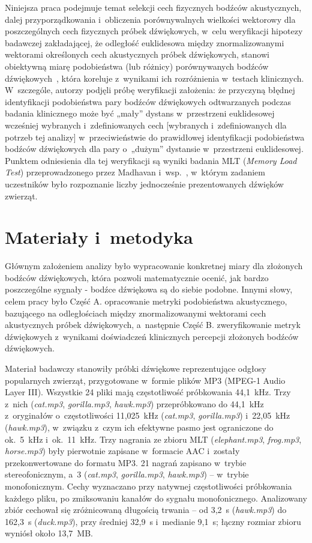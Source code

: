 \documentclass{article}
\begin{document}
Niniejsza praca podejmuje temat selekcji cech fizycznych bodźców akustycznych, dalej przyporządkowania i~obliczenia porównywalnych wielkości wektorowy dla poszczególnych cech fizycznych próbek dźwiękowych, w~celu weryfikacji hipotezy badawczej zakładającej, że odległość euklidesowa między znormalizowanymi wektorami określonych cech akustycznych próbek dźwiękowych, stanowi obiektywną miarę podobieństwa (lub różnicy) porównywanych bodźców dźwiękowych~\cite{MadhavanWrobel2024MLT}, która koreluje z~wynikami ich rozróżnienia w~testach klinicznych. W~szczególe, autorzy podjęli próbę weryfikacji założenia: że przyczyną błędnej identyfikacji podobieństwa pary bodźców dźwiękowych odtwarzanych podczas badania klinicznego może być „mały” dystans w~przestrzeni euklidesowej wcześniej wybranych i~zdefiniowanych cech [wybranych i~zdefiniowanych dla potrzeb tej analizy]  w~przeciwieństwie do prawidłowej identyfikacji podobieństwa bodźców dźwiękowych dla pary o~„dużym” dystansie w~przestrzeni euklidesowej. Punktem odniesienia dla tej weryfikacji są wyniki badania MLT (\textit{Memory Load Test}) przeprowadzonego przez Madhavan i~wsp.~\cite{MadhavanWrobel2024MLT}, w~którym zadaniem uczestników było rozpoznanie liczby jednocześnie prezentowanych dźwięków zwierząt.


\section{Materiały i~metodyka}
\label{section:mat_met}

Głównym założeniem analizy było wypracowanie konkretnej miary dla złożonych bodźców dźwiękowych, która pozwoli matematycznie ocenić, jak bardzo poszczególne sygnały - bodźce dźwiękowa są do siebie podobne. Innymi słowy, celem pracy było Część A. opracowanie metryki podobieństwa akustycznego, bazującego na odległościach między znormalizowanymi wektorami cech akustycznych próbek dźwiękowych, a~następnie Część B. zweryfikowanie metryk dźwiękowych z~wynikami doświadczeń klinicznych percepcji złożonych bodźców dźwiękowych.

Materiał badawczy stanowiły próbki dźwiękowe reprezentujące odgłosy popularnych zwierząt, przygotowane w~formie plików MP3 (MPEG-1 Audio Layer III). Wszystkie 24 pliki mają częstotliwość próbkowania 44,1~kHz. Trzy z~nich (\textit{cat.mp3}, \textit{gorilla.mp3}, \textit{hawk.mp3}) przepróbkowano do 44,1~kHz z~oryginałów o~częstotliwości 11,025~kHz (\textit{cat.mp3}, \textit{gorilla.mp3}) i~22,05~kHz (\textit{hawk.mp3}), w~związku z~czym ich efektywne pasmo jest ograniczone do ok.~5~kHz i~ok.~11~kHz. Trzy nagrania ze zbioru MLT (\textit{elephant.mp3}, \textit{frog.mp3}, \textit{horse.mp3}) były pierwotnie zapisane w~formacie AAC i~zostały przekonwertowane do formatu MP3. 21 nagrań zapisano w~trybie stereofonicznym, a~3 (\textit{cat.mp3}, \textit{gorilla.mp3}, \textit{hawk.mp3}) -- w~trybie monofonicznym. Cechy wyznaczano przy natywnej częstotliwości próbkowania każdego pliku, po zmiksowaniu kanałów do sygnału monofonicznego. Analizowany zbiór cechował się zróżnicowaną długością trwania -- od 3,2~s (\textit{hawk.mp3}) do 162,3~s (\textit{duck.mp3}), przy średniej 32,9~s i~medianie 9,1~s; łączny rozmiar zbioru wyniósł około 13,7~MB.
\end{document}
